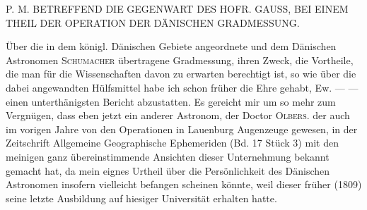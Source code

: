 \par\bigskip
{}
\begin{center}\large P. M. BETREFFEND DIE GEGENWART DES HOFR. GAUSS, BEI EINEM THEIL DER OPERATION DER DÄNISCHEN GRADMESSUNG.\end{center}
\par
Über die in dem königl. Dänischen Gebiete angeordnete und dem Dänischen Astronomen \textsc{Schumacher} übertragene Gradmessung, ihren Zweck, die Vortheile, die man für die Wissenschaften davon zu erwarten berechtigt ist, so wie über die dabei angewandten Hülfsmittel habe ich schon früher die Ehre gehabt, Ew. — — einen unterthänigsten Bericht abzustatten. Es gereicht mir um so mehr zum Vergnügen, dass eben jetzt ein anderer Astronom, der Doctor \textsc{Olbers}. der auch im vorigen Jahre von den Operationen in Lauenburg Augenzeuge gewesen, in der Zeitschrift Allgemeine Geographische Ephemeriden (Bd. 17 Stück 3) mit den meinigen ganz übereinstimmende Ansichten dieser Unternehmung bekannt gemacht hat, da mein eignes Urtheil über die Persönlichkeit des Dänischen Astronomen insofern vielleicht befangen scheinen könnte, weil dieser früher (1809) seine letzte Ausbildung auf hiesiger Universität erhalten hatte.
